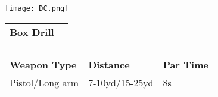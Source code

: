\documentclass[../Cover.tex]{subfiles}
\begin{document}
	\begin{minipage}[t][0.2\textheight][t]{0.1\textwidth} 
		\texttt{[image: DC.png]}
	\end{minipage}
	\hfill
	\begin{minipage}[t][0.2\textheight][t]{0.8\textwidth}
		\begin{tabular}{ p{} l  }		
			\\	
			\textbf{Box Drill} \\
			\\[0.09\textheight]
		\end{tabular}
		\quad
		\begin{tabular}{ | p{} | p{} | p{} |}
			\hline
			\rowcolor[HTML]{C0C0C0}\tiny Weapon Type & \tiny Distance & \tiny Par Time\\ 
			\hline
			\tiny Pistol/Long arm & \tiny 7-10yd/15-25yd & \tiny 8s \\ %
			\hline
		\end{tabular}
	\end{minipage}
\end{document}

